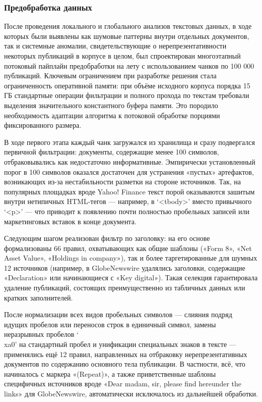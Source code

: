 \subsubsection{Предобработка данных}
\label{sec:data_prep}
После проведения локального и глобального анализов текстовых данных, в ходе которых были выявлены как шумовые
паттерны внутри отдельных документов, так и системные аномалии, свидетельствующие о нерепрезентативности некоторых
публикаций в корпусе в целом, был спроектирован многоэтапный потоковый пайплайн предобработки на лету с использованием
чанков по 100 000 публикаций. Ключевым ограничением при разработке решения стала ограниченность оперативной памяти: при
объёме исходного корпуса порядка 15 ГБ стандартные операции фильтрации и полного прохода по текстам требовали выделения
значительного константного буфера памяти. Это породило необходимость адаптации алгоритма к потоковой обработке порциями
фиксированного размера.

В ходе первого этапа каждый чанк загружался из хранилища и сразу подвергался первичной фильтрации: документы,
содержащие менее 100 символов, отбраковывались как недостаточно информативные. Эмпирически установленный порог
в 100 символов оказался достаточен для устранения «пустых» артефактов, возникающих из-за нестабильности разметки
на стороне источников. Так, на популярных площадках вроде Yahoo! Finance текст порой оказываются зашитым внутри
нетипичных HTML-тегов — например, в ‘<tbody>’ вместо привычного ‘<p>’ — что приводит к появлению почти полностью
пробельных записей или маркетинговых вставок в конце документа.

Следующим шагом реализован фильтр по заголовку: на его основе формализованы 66 правил, охватывающих как общие
шаблоны («Form 8», «Net Asset Value», «Holdings in company»), так и более таргетированные для шумных 12 источников
(например, в GlobeNewswire удалялись заголовки, содержащие «Declaration» или начинающиеся с «Key digital»). Такая
селекция гарантировала удаление публикаций, состоящих преимущественно из табличных данных или кратких заполнителей.

После нормализации всех видов пробельных символов — слияния подряд идущих пробелов или переносов строк в единичный
символ, замены неразрывных пробелов ‘\\xa0’ на стандартный пробел и унификации специальных знаков в тексте ---
применялись ещё 12 правил, направленных на отбраковку нерепрезентативных документов по содержанию основного тела
публикации. В частности, всё, что начиналось с маркера «(Repeat)», а также приветственные шаблоны специфичных
источников вроде «Dear madam, sir, please find hereunder the links» для GlobeNewswire, автоматически исключалось
из дальнейшей обработки.

